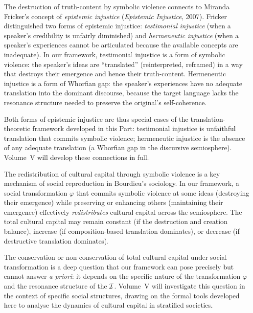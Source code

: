 \begin{interpretation}
\label{interp:symbolic-violence-epistemic}
The destruction of truth-content by symbolic violence connects to Miranda Fricker's concept of \emph{epistemic injustice} (\textit{Epistemic Injustice}, 2007).  Fricker distinguished two forms of epistemic injustice: \emph{testimonial injustice} (when a speaker's credibility is unfairly diminished) and \emph{hermeneutic injustice} (when a speaker's experiences cannot be articulated because the available concepts are inadequate).  In our framework, testimonial injustice is a form of symbolic violence: the speaker's ideas are ``translated'' (reinterpreted, reframed) in a way that destroys their emergence and hence their truth-content.  Hermeneutic injustice is a form of Whorfian gap: the speaker's experiences have no adequate translation into the dominant discourse, because the target language lacks the resonance structure needed to preserve the original's self-coherence.

Both forms of epistemic injustice are thus special cases of the translation-theoretic framework developed in this Part: testimonial injustice is unfaithful translation that commits symbolic violence; hermeneutic injustice is the absence of any adequate translation (a Whorfian gap in the discursive semiosphere).  Volume~V will develop these connections in full.
\end{interpretation}

\begin{remark}
\label{rem:redistribution}
The redistribution of cultural capital through symbolic violence is a key mechanism of social reproduction in Bourdieu's sociology.  In our framework, a social transformation $\varphi$ that commits symbolic violence at some ideas (destroying their emergence) while preserving or enhancing others (maintaining their emergence) effectively \emph{redistributes} cultural capital across the semiosphere.  The total cultural capital may remain constant (if the destruction and creation balance), increase (if composition-based translation dominates), or decrease (if destructive translation dominates).

The conservation or non-conservation of total cultural capital under social transformation is a deep question that our framework can pose precisely but cannot answer \emph{a priori}: it depends on the specific nature of the transformation $\varphi$ and the resonance structure of the $\mathcal{I}$.  Volume~V will investigate this question in the context of specific social structures, drawing on the formal tools developed here to analyse the dynamics of cultural capital in stratified societies.
\end{remark}

